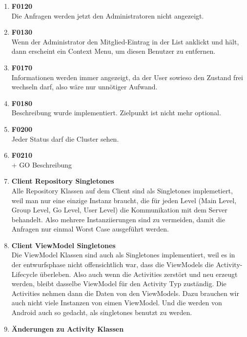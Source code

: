 \documentclass[11pt,a4paper]{scrartcl}
\begin{document}
\begin{enumerate}
 \item \textbf{F0120}\\ Die Anfragen werden jetzt den Administratoren nicht angezeigt.

\item \textbf{F0130}\\ Wenn der Administrator den Mitglied-Eintrag in der List anklickt und hält, dann erscheint ein Context Menu, um diesen Benutzer zu entfernen.

\item \textbf{F0170}\\ Informationen werden immer angezeigt, da der User sowieso den Zustand frei wechseln darf, also wäre nur unnötiger Aufwand.

\item \textbf{F0180}\\ Beschreibung wurde implementiert. Zielpunkt ist nicht mehr optional.

\item \textbf{F0200}\\ Jeder Status darf die Cluster sehen.

\item \textbf{F0210}\\ + GO Beschreibung

\item \textbf{Client Repository Singletones}\\
	Alle Repository Klassen auf dem Client sind als Singletones implemetiert, weil man nur eine einzige Instanz braucht, die für jeden Level (Main Level,  Group Level, Go Level, User Level) die Kommunikation mit dem Server behandelt. Also mehrere Instanziierungen sind zu vermeiden, damit die Anfragen nur einmal Worst Case ausgeführt werden.
	
\item \textbf{Client ViewModel Singletones}\\
Die ViewModel Klassen sind auch als Singletones implementiert, weil es in der entwurfsphase nicht offensichtlich war, dass die ViewModels die Activity-Lifecycle überleben. Also auch wenn die Activities zerstört und neu erzeugt werden, bleibt dasselbe ViewModel für den Activity Typ zuständig. Die Activities nehmen dann die Daten von den ViewModels. Dazu brauchen wir auch nicht viele Instanzen von eimen ViewModel. Und die werden von Android auch so gedacht, als singletones benutzt zu werden.

\item \textbf{Änderungen zu Activity Klassen}\\


\end{enumerate}
\end{document}
